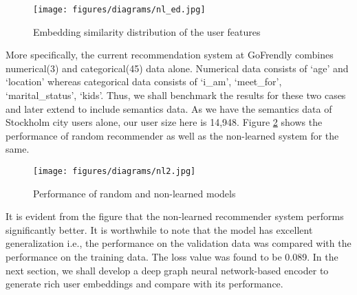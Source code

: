 \documentclass{kththesis}
\begin{document}
\begin{figure}[h!]
\centering
\texttt{[image: figures/diagrams/nl\_ed.jpg]}
\caption{Embedding similarity distribution of the user features}
\label{fig:nled}
\end{figure}

More specifically, the current recommendation system at GoFrendly combines numerical(3) and categorical(45) data alone. Numerical data consists of `age' and `location' whereas categorical data consists of ‘i\_am’, ‘meet\_for’, ‘marital\_status’, ‘kids’. Thus, we shall benchmark the results for these two cases and later extend to include semantics data. As we have the semantics data of Stockholm city users alone, our user size here is 14,948. Figure \ref{fig:nl2} shows the performance of random recommender as well as the non-learned system for the same. \\


\begin{figure}[h!]
\centering
\texttt{[image: figures/diagrams/nl2.jpg]}
\caption{Performance of random and non-learned models}
\label{fig:nl2}
\end{figure}

It is evident from the figure that the non-learned recommender system performs significantly better. It is worthwhile to note that the model has excellent generalization i.e., the performance on the validation data was compared with the performance on the training data. The loss value was found to be 0.089. In the next section, we shall develop a deep graph neural network-based encoder to generate rich user embeddings and compare with its performance.

\end{document}
